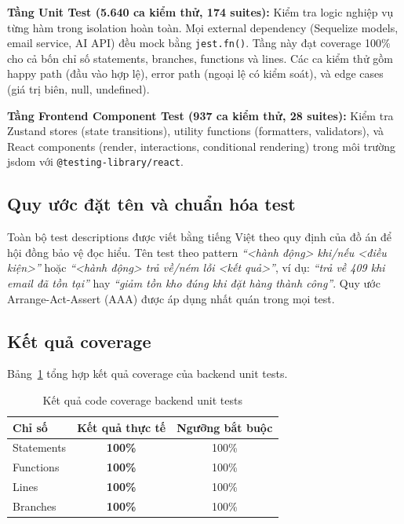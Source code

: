 \textbf{Tầng Unit Test (5.640 ca kiểm thử, 174 suites):} Kiểm tra logic nghiệp vụ từng hàm trong isolation hoàn toàn. Mọi external dependency (Sequelize models, email service, AI API) đều mock bằng \texttt{jest.fn()}. Tầng này đạt coverage 100\% cho cả bốn chỉ số statements, branches, functions và lines. Các ca kiểm thử gồm happy path (đầu vào hợp lệ), error path (ngoại lệ có kiểm soát), và edge cases (giá trị biên, null, undefined).

\textbf{Tầng Frontend Component Test (937 ca kiểm thử, 28 suites):} Kiểm tra Zustand stores (state transitions), utility functions (formatters, validators), và React components (render, interactions, conditional rendering) trong môi trường jsdom với \texttt{@testing-library/react}.

\subsection{Quy ước đặt tên và chuẩn hóa test}

Toàn bộ test descriptions được viết bằng tiếng Việt theo quy định của đồ án để hội đồng bảo vệ đọc hiểu. Tên test theo pattern \textit{``<hành động> khi/nếu <điều kiện>''} hoặc \textit{``<hành động> trả về/ném lỗi <kết quả>''}, ví dụ: \textit{``trả về 409 khi email đã tồn tại''} hay \textit{``giảm tồn kho đúng khi đặt hàng thành công''}. Quy ước Arrange-Act-Assert (AAA) được áp dụng nhất quán trong mọi test.

\subsection{Kết quả coverage}

Bảng~\ref{tab:coverage_results} tổng hợp kết quả coverage của backend unit tests.

\begin{table}[H]
  \centering
  \caption{Kết quả code coverage backend unit tests}
  \label{tab:coverage_results}
  \begin{tabular}{|l|c|c|}
    \hline
    \textbf{Chỉ số} & \textbf{Kết quả thực tế} & \textbf{Ngưỡng bắt buộc} \\
    \hline
    Statements & \textbf{100\%} & 100\% \\
    \hline
    Functions & \textbf{100\%} & 100\% \\
    \hline
    Lines & \textbf{100\%} & 100\% \\
    \hline
    Branches & \textbf{100\%} & 100\% \\
    \hline
  \end{tabular}
\end{table}

